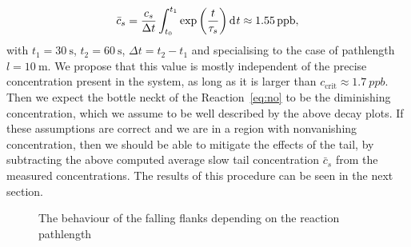 \begin{align*}
  \bar c_s = \frac{c_s}{\Delta t} \int_{t_0}^{t_1}
  \exp\left(\frac{t}{\tau_s}\right)\d[t] \approx \SI{1.55}{ppb},
\end{align*}
with $t_1 = \SI{30}{\second}$, $t_2 = \SI{60}{\second}$, $\Delta t =
t_2 - t_1$ and specialising to the case of pathlength $l =
\SI{10}{\meter}$. We propose that this value is mostly independent of
the precise  concentration present in the system, as long as it
is larger than $c_{\text{crit}} \approx \SI{1.7}{ppb}$. Then we expect
the bottle neckt of the Reaction~\eqref{eq:no} to be the diminishing
 concentration, which we assume to be well described by the
above decay plots. If these assumptions are correct and we are in a
region with nonvanishing  concentration, then we should be able
to mitigate the effects of the tail, by subtracting the above computed
average slow tail concentration $\bar c_s$ from the measured 
concentrations. The results of this procedure can be seen in the next
section.
\begin{figure}[htbp]
  \centering
  
  \caption{The behaviour of the falling flanks depending on the
    reaction pathlength}
  \label{fig:switch-pl}
\end{figure}


